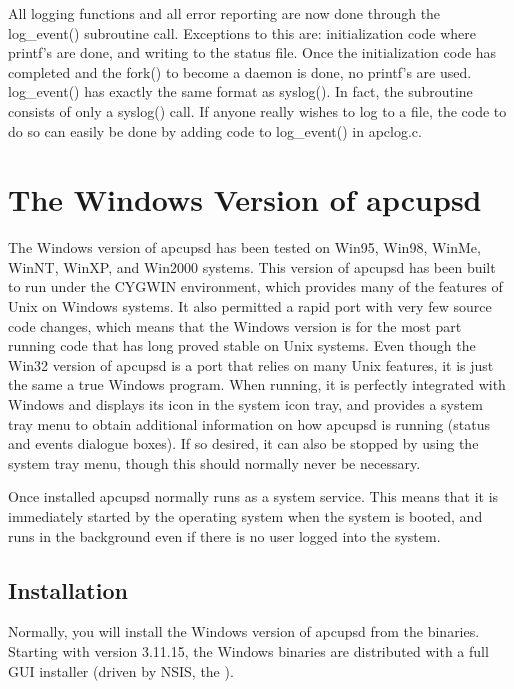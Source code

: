 {{{{{{{{{\label{index-Developers-Notes-169}
All logging functions and all error reporting are now done through the
log\_event() subroutine call. Exceptions to this are: initialization code
where printf's are done, and writing to the status file. Once the
initialization code has completed and the fork() to become a daemon is done,
no printf's are used. log\_event() has exactly the same format as syslog(). In
fact, the subroutine consists of only a syslog() call. If anyone really wishes
to log to a file, the code to do so can easily be done by adding code to
log\_event() in apclog.c. 


\section*{The Windows Version of apcupsd}
\label{The-Windows-Version-of-apcupsd}

The Windows version of apcupsd has been tested on Win95, Win98, WinMe, WinNT,
WinXP, and Win2000 systems. This version of apcupsd has been built to run
under the CYGWIN environment, which provides many of the features of Unix on
Windows systems. It also permitted a rapid port with very few source code
changes, which means that the Windows version is for the most part running
code that has long proved stable on Unix systems. Even though the Win32
version of apcupsd is a port that relies on many Unix features, it is just the
same a true Windows program. When running, it is perfectly integrated with
Windows and displays its icon in the system icon tray, and provides a system
tray menu to obtain additional information on how apcupsd is running (status
and events dialogue boxes). If so desired, it can also be stopped by using the
system tray menu, though this should normally never be necessary.  

Once installed apcupsd normally runs as a system service.  This means that it
is immediately started by the operating system when the system is booted, and
runs in the background even if there is no user logged into the system. 

\label{Installation}
\subsection*{Installation}

Normally, you will install the Windows version of apcupsd from the binaries.
Starting with version 3.11.15, the Windows binaries are distributed with
a full GUI installer (driven by NSIS, the 
).

}}}}}}}}}
